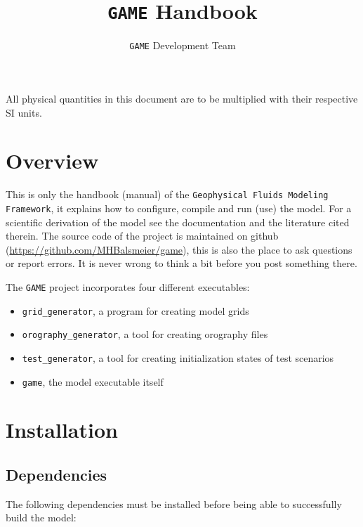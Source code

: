 \documentclass[10pt]{report}
\title{\texttt{GAME} Handbook}
\author{\texttt{GAME} Development Team}
\begin{document}
\maketitle

\vspace*{5 cm}
\begin{center}
All physical quantities in this document are to be multiplied with their respective SI units.
\end{center}

\newpage

\tableofcontents

\chapter{Overview}
\label{chap:overview}

This is only the handbook (manual) of the \texttt{Geophysical Fluids Modeling Framework}, it explains how to configure, compile and run (use) the model. For a scientific derivation of the model see the documentation and the literature cited therein. The source code of the project is maintained on github (\url{https://github.com/MHBalsmeier/game}), this is also the place to ask questions or report errors. It is never wrong to think a bit before you post something there.

The \texttt{GAME} project incorporates four different executables:

\begin{itemize}
\item \texttt{grid\_generator}, a program for creating model grids
\item \texttt{orography\_generator}, a tool for creating orography files
\item \texttt{test\_generator}, a tool for creating initialization states of test scenarios
\item \texttt{game}, the model executable itself
\end{itemize}

\chapter{Installation}
\label{chap:installation}

\section{Dependencies}
\label{sec:dependencies}

The following dependencies must be installed before being able to successfully build the model:
\end{document}
